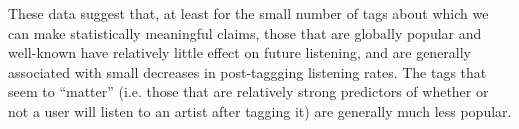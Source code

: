 These data suggest that, at least for the small number of tags about which we can make statistically meaningful claims, those that are globally popular and well-known have relatively little effect on future listening, and are generally associated with small decreases in post-taggging listening rates. The tags that seem to ``matter'' (i.e. those that are relatively strong predictors of whether or not a user will listen to an artist after tagging it) are generally much less popular.
